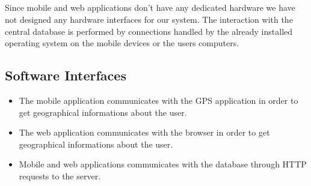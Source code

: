 \documentclass{report}
\begin{document}
			
			



		\subsection{}
		Since mobile and web applications don't have any dedicated hardware we have not designed any hardware interfaces for our system.
		The interaction with the central database is performed by connections handled by the already installed operating system on the mobile devices or the users computers.

		\subsection{Software Interfaces}
			\begin{itemize}
				\item The mobile application communicates with the GPS application in order to get geographical informations about the user.
				
				\item The web application communicates with the browser in order to get geographical informations about the user.
				
				\item Mobile and web applications communicates with the database through HTTP requests to the server.
			\end{itemize}
\end{document}
